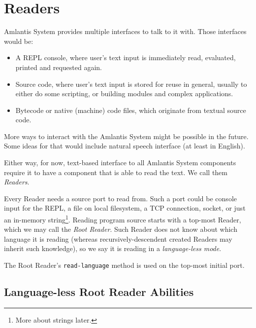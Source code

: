 
\chapter{Readers}
\label{sec:commons-readers}

Amlantis System provides multiple interfaces to talk to it with. Those interfaces would be:

\begin{itemize}
  \item A REPL console, where user's text input is immediately read, evaluated, printed and requested again.
  \item Source code, where user's text input is stored for reuse in general, usually to either do some scripting, or building modules and complex applications. 
  \item Bytecode or native (machine) code files, which originate from textual source code.
\end{itemize}

More ways to interact with the Amlantis System might be possible in the future. Some ideas for that would include natural speech interface (at least in English).

Either way, for now, text-based interface to all Amlantis System components require it to have a component that is able to read the text. We call them {\em Readers}.

Every Reader needs a source port to read from. Such a port could be console input for the REPL, a file on local filesystem, a TCP connection, socket, or just an in-memory string\footnote{More about strings later.}. Reading program source starts with a top-most Reader, which we may call the {\em Root Reader}. Such Reader does not know about which language it is reading (whereas recursively-descendent created Readers may inherit such knowledge), so we say it is reading in a {\em language-less mode}.

The Root Reader's \lstinline!read-language! method is used on the top-most initial port. 




\newpage

\section{Language-less Root Reader Abilities}

